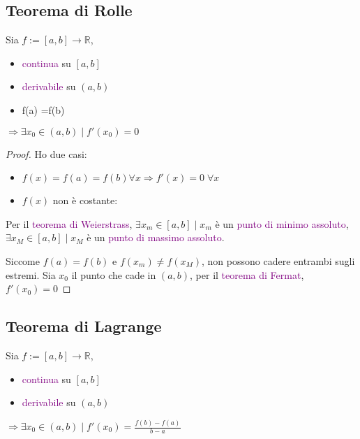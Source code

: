 \documentclass{article}
\begin{document}
\subsection{Teorema di Rolle}

      \begin{tcolorbox}[colback= red!15!yellow!5!white, colframe=red]

Sia $f:= [a,b] \to \mathbb{R} $, 
\begin{itemize}
    \item \textcolor{purple}{continua} su $[a,b]$
    \item \textcolor{purple}{derivabile} su $(a,b)$
    \item f(a) =f(b) 
\end{itemize}

    $\Rightarrow \exists x_0 \in (a, b) \mid f'(x_0) = 0 $ 
\end{tcolorbox}

\begin{proof}
    Ho  due casi: 
    
    \begin{itemize}
    \item $f(x) = f(a) = f(b) \forall x \Rightarrow f'(x) = 0 \; \forall x$
    \item $f(x)$ non è costante:
    \end{itemize}
   Per il \textcolor{purple}{teorema di Weierstrass}, $\exists x_m \in [a,b] \mid x_m$ è un \textcolor{purple}{punto di minimo assoluto}, $\exists x_M \in [a,b] \mid x_M$ è un \textcolor{purple}{punto di massimo assoluto}. 

   Siccome $f(a) = f(b) $ e $f(x_m )\neq f(x_M)$, non possono cadere entrambi sugli estremi. Sia $x_0 $ il punto che cade in $(a,b)$, per il \textcolor{purple}{teorema di Fermat}, $f'(x_0) = 0$
\end{proof}

\subsection{Teorema di Lagrange}

      \begin{tcolorbox}[colback= red!15!yellow!5!white, colframe=red]

Sia $f:= [a,b] \to \mathbb{R} $, 
\begin{itemize}
    \item \textcolor{purple}{continua} su $[a,b]$
    \item \textcolor{purple}{derivabile} su $(a,b)$
\end{itemize}

    $\Rightarrow \exists x_0 \in (a, b) \mid f'(x_0) = \frac{f(b) - f(a)}{b -a}$ 
\end{tcolorbox}
\end{document}
